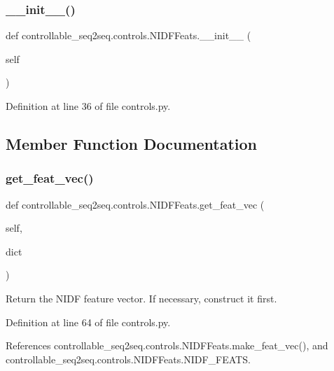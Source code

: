 \subsubsection{\texorpdfstring{\+\_\+\+\_\+init\+\_\+\+\_\+()}{\_\_init\_\_()}}
{\footnotesize\ttfamily def controllable\+\_\+seq2seq.\+controls.\+N\+I\+D\+F\+Feats.\+\_\+\+\_\+init\+\_\+\+\_\+ (\begin{DoxyParamCaption}\item[{}]{self }\end{DoxyParamCaption})}



Definition at line 36 of file controls.\+py.



\subsection{Member Function Documentation}
\mbox{\label{classcontrollable__seq2seq_1_1controls_1_1NIDFFeats_a4459af283d40b0a2818ca204a8056029}} 
\subsubsection{\texorpdfstring{get\+\_\+feat\+\_\+vec()}{get\_feat\_vec()}}
{\footnotesize\ttfamily def controllable\+\_\+seq2seq.\+controls.\+N\+I\+D\+F\+Feats.\+get\+\_\+feat\+\_\+vec (\begin{DoxyParamCaption}\item[{}]{self,  }\item[{}]{dict }\end{DoxyParamCaption})}

\begin{DoxyVerb}Return the NIDF feature vector. If necessary, construct it first.
\end{DoxyVerb}
 

Definition at line 64 of file controls.\+py.



References controllable\+\_\+seq2seq.\+controls.\+N\+I\+D\+F\+Feats.\+make\+\_\+feat\+\_\+vec(), and controllable\+\_\+seq2seq.\+controls.\+N\+I\+D\+F\+Feats.\+N\+I\+D\+F\+\_\+\+F\+E\+A\+TS.

